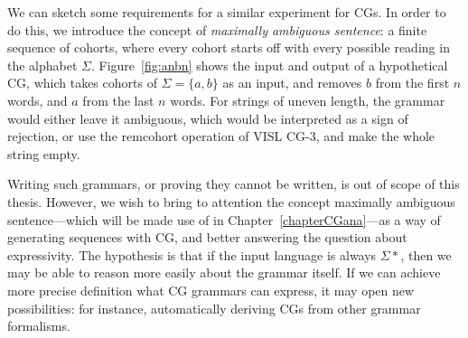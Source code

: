 We can sketch some requirements for a similar experiment for CGs.
In order to do this, we introduce the concept of \emph{maximally ambiguous sentence}: a finite sequence of cohorts, where every cohort starts off with every possible reading in the alphabet $\Sigma$. 
Figure~\ref{fig:anbn} shows the input and output of a hypothetical CG, which takes cohorts
of $\Sigma = \{a, b\}$ as an input, and removes $b$ from the first $n$ words, and $a$ from the last $n$ words. 
For strings of uneven length, the grammar would either leave it ambiguous, which would be interpreted as a sign of rejection, or use the {\sc remcohort} operation of VISL CG-3, and make the whole string empty.

Writing such grammars, or proving they cannot be written, is out of scope of this thesis.
However, we wish to bring to attention the concept maximally ambiguous sentence---which 
will be made use of in Chapter~\ref{chapterCGana}---as a way of generating sequences with CG,
and better answering the question about expressivity.
The hypothesis is that if the input language is always $\Sigma{}*$, then we may be able to reason more easily about the grammar itself. 
If we can achieve more precise definition what CG grammars can express, 
it may open new possibilities: for instance, automatically deriving CGs from other grammar formalisms. 








